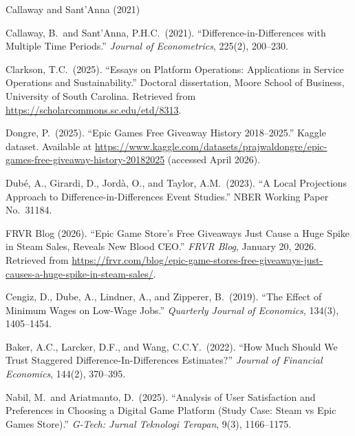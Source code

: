 \documentclass[11pt]{article}
\begin{document}
\clearpage

\begin{thebibliography}{Callaway and Sant'Anna (2021)}
\setlength{\itemsep}{0.8em}

Callaway, B.\ and Sant'Anna, P.H.C.\ (2021).
``Difference-in-Differences with Multiple Time Periods.''
\textit{Journal of Econometrics}, 225(2), 200--230.

Clarkson, T.C.\ (2025).
``Essays on Platform Operations: Applications in Service Operations and Sustainability.''
Doctoral dissertation, Moore School of Business, University of South Carolina.
Retrieved from \url{https://scholarcommons.sc.edu/etd/8313}.

Dongre, P.\ (2025).
``Epic Games Free Giveaway History 2018--2025.''
Kaggle dataset. Available at
\url{https://www.kaggle.com/datasets/prajwaldongre/epic-games-free-giveaway-history-20182025}
(accessed April 2026).

Dub\'{e}, A., Girardi, D., Jord\`{a}, O., and Taylor, A.M.\ (2023).
``A Local Projections Approach to Difference-in-Differences Event Studies.''
NBER Working Paper No.\ 31184.

FRVR Blog (2026).
``Epic Game Store's Free Giveaways Just Cause a Huge Spike in Steam Sales,
Reveals New Blood CEO.''
\textit{FRVR Blog}, January 20, 2026.
Retrieved from \url{https://frvr.com/blog/epic-game-stores-free-giveaways-just-causes-a-huge-spike-in-steam-sales/}.


Cengiz, D., Dube, A., Lindner, A., and Zipperer, B.\ (2019).
``The Effect of Minimum Wages on Low-Wage Jobs.''
\textit{Quarterly Journal of Economics}, 134(3), 1405--1454.

Baker, A.C., Larcker, D.F., and Wang, C.C.Y.\ (2022).
``How Much Should We Trust Staggered Difference-In-Differences Estimates?''
\textit{Journal of Financial Economics}, 144(2), 370--395.

Nabil, M.\ and Ariatmanto, D.\ (2025).
``Analysis of User Satisfaction and Preferences in Choosing a Digital Game Platform
(Study Case: Steam vs Epic Games Store).''
\textit{G-Tech: Jurnal Teknologi Terapan}, 9(3), 1166--1175.


\end{thebibliography}
\end{document}
